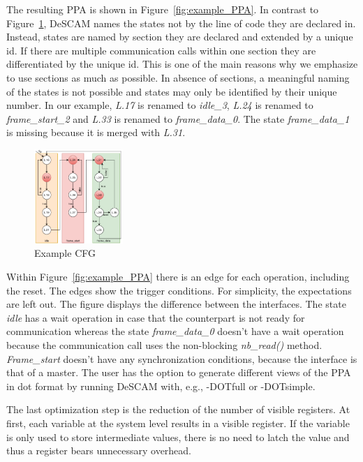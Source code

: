 The resulting PPA is shown in Figure~\ref{fig:example_PPA}. 
In contrast to Figure~\ref{fig:cfg_colored}, DeSCAM names the states not by the line of code they are declared in. 
Instead, states are named by section they are declared and extended by a unique id. 
If there are multiple communication calls within one section they are differentiated by the unique id. 
This is one of the main reasons why we emphasize to use sections as much as possible. 
In absence of sections, a meaningful naming of the states is not possible and states may only be identified by their unique number. 
In our example, \textit{L.17} is renamed to \textit{idle\_3}, \textit{L.24} is renamed to \textit{frame\_start\_2} and \textit{L.33} is renamed to \textit{frame\_data\_0}. The state \textit{frame\_data\_1} is missing because it is merged with \textit{L.31}.

\begin{figure}
	\vspace{-20pt}
    \caption{Example CFG}
    \label{fig:cfg_colored}
    \includegraphics[width=0.3\textwidth]{fig/example_cfg_colored.pdf}
    \vspace{-20pt}
\end{figure}

Within Figure~\ref{fig:example_PPA} there is an edge for each operation, including the reset. 
The edges show the trigger conditions. For simplicity, the expectations are left out. 
The figure displays the difference between the interfaces. 
The state \textit{idle} has a wait operation in case that the counterpart is not ready for communication whereas the state \textit{frame\_data\_0} doesn't have a wait operation because the communication call uses the non-blocking \textit{nb\_read()} method. 
\textit{Frame\_start} doesn't have any synchronization conditions, because the interface is that of a master.  
The user has the option to generate different views of the PPA in dot format by running DeSCAM with, e.g., -DOTfull or -DOTsimple.  

The last optimization step is the reduction of the number of visible registers. 
At first, each variable at the system level results in a visible register. 
If the variable is only used to store intermediate values, there is no need to latch the value and thus a register bears unnecessary overhead. 

